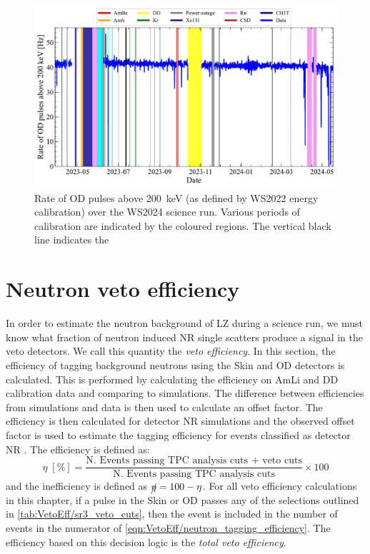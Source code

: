 \begin{figure}[!ht]
	\centering
	\includegraphics[width=\textwidth]{figures/VetoEfficiency/prem_od_stability.pdf}
	\caption[Rate of OD pulses above 200~keV over the WS2024 science run.]{Rate of OD pulses above 200~keV (as defined by WS2022 energy calibration) over the WS2024 science run. Various periods of calibration are indicated by the coloured regions. The vertical black line indicates the }
	\label{fig:VetoEff/deadtime_stability_prem}
\end{figure}

\section{Neutron veto efficiency}\label{sec:VetoEff/efficiency}
In order to estimate the neutron background of LZ during a science run, we must know what fraction of neutron induced NR single scatters produce a signal in the veto detectors. We call this quantity the \textit{veto efficiency}.
In this section, the efficiency of tagging background neutrons using the Skin and OD detectors is calculated.
This is performed by calculating the efficiency on AmLi and DD calibration data and comparing to simulations.
The difference between efficiencies from simulations and data is then used to calculate an offset factor.
The efficiency is then calculated for detector NR simulations and the observed offset factor is used to estimate the tagging efficiency for events classified as detector NR \cite{LZ:2022ysc,LZ:2024zvo}.
The efficiency is defined as:
\begin{equation}\label{eqn:VetoEff/neutron_tagging_efficiency}
	\eta\;[\%] = \frac{\textrm{N. Events passing TPC analysis cuts + veto cuts}}{\textrm{N. Events passing TPC analysis cuts}} \times 100
\end{equation}
and the inefficiency is defined as $\cancel{\eta}=100-\eta$. For all veto efficiency calculations in this chapter, if a pulse in the Skin or OD passes any of the selections outlined in \autoref{tab:VetoEff/sr3_veto_cuts}, then the event is included in the number of events in the numerator of \autoref{eqn:VetoEff/neutron_tagging_efficiency}. The efficiency based on this decision logic is the \textit{total veto efficiency}.

